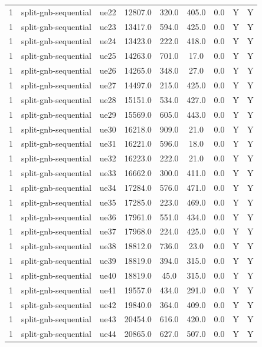 \begin{table}[ht]
\begin{tabular}{|c|c|c|c|c|c|c|c|c|}
1 & split-gnb-sequential & ue22 & 12807.0 & 320.0 & 405.0 & 0.0 & Y & Y \\
1 & split-gnb-sequential & ue23 & 13417.0 & 594.0 & 425.0 & 0.0 & Y & Y \\
1 & split-gnb-sequential & ue24 & 13423.0 & 222.0 & 418.0 & 0.0 & Y & Y \\
1 & split-gnb-sequential & ue25 & 14263.0 & 701.0 & 17.0 & 0.0 & Y & Y \\
1 & split-gnb-sequential & ue26 & 14265.0 & 348.0 & 27.0 & 0.0 & Y & Y \\
1 & split-gnb-sequential & ue27 & 14497.0 & 215.0 & 425.0 & 0.0 & Y & Y \\
1 & split-gnb-sequential & ue28 & 15151.0 & 534.0 & 427.0 & 0.0 & Y & Y \\
1 & split-gnb-sequential & ue29 & 15569.0 & 605.0 & 443.0 & 0.0 & Y & Y \\
1 & split-gnb-sequential & ue30 & 16218.0 & 909.0 & 21.0 & 0.0 & Y & Y \\
1 & split-gnb-sequential & ue31 & 16221.0 & 596.0 & 18.0 & 0.0 & Y & Y \\
1 & split-gnb-sequential & ue32 & 16223.0 & 222.0 & 21.0 & 0.0 & Y & Y \\
1 & split-gnb-sequential & ue33 & 16662.0 & 300.0 & 411.0 & 0.0 & Y & Y \\
1 & split-gnb-sequential & ue34 & 17284.0 & 576.0 & 471.0 & 0.0 & Y & Y \\
1 & split-gnb-sequential & ue35 & 17285.0 & 223.0 & 469.0 & 0.0 & Y & Y \\
1 & split-gnb-sequential & ue36 & 17961.0 & 551.0 & 434.0 & 0.0 & Y & Y \\
1 & split-gnb-sequential & ue37 & 17968.0 & 224.0 & 425.0 & 0.0 & Y & Y \\
1 & split-gnb-sequential & ue38 & 18812.0 & 736.0 & 23.0 & 0.0 & Y & Y \\
1 & split-gnb-sequential & ue39 & 18819.0 & 394.0 & 315.0 & 0.0 & Y & Y \\
1 & split-gnb-sequential & ue40 & 18819.0 & 45.0 & 315.0 & 0.0 & Y & Y \\
1 & split-gnb-sequential & ue41 & 19557.0 & 434.0 & 291.0 & 0.0 & Y & Y \\
1 & split-gnb-sequential & ue42 & 19840.0 & 364.0 & 409.0 & 0.0 & Y & Y \\
1 & split-gnb-sequential & ue43 & 20454.0 & 616.0 & 420.0 & 0.0 & Y & Y \\
1 & split-gnb-sequential & ue44 & 20865.0 & 627.0 & 507.0 & 0.0 & Y & Y \\

\end{tabular}
\end{table}
